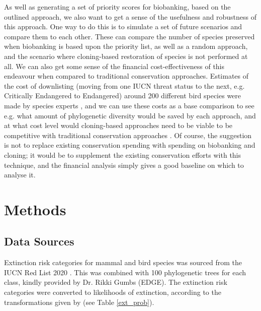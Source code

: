 \documentclass[10pt]{article}
\begin{document}
	As well as generating a set of priority scores for biobanking, based on the
	outlined approach, we also want to get a sense of the usefulness and
	robustness of this approach. One way to do this is to simulate a set of future
	scenarios and compare them to each other. These can compare the number of species
	preserved when biobanking is based upon the priority list, as well as a random
	approach, and the scenario where cloning-based restoration of species is not
	performed at all. We can also get some sense of the financial cost-effectiveness of
	this endeavour when compared to traditional conservation approaches. Estimates of the
	cost of downlisting (moving from one IUCN threat status to the next, e.g. Critically
	Endangered to Endangered) around 200 different bird species were made by
	species experts \cite{mccarthyFinancialCostsMeeting2012}, and we can use these costs as a base comparison to see e.g. what
	amount of phylogenetic diversity would be saved by each approach, and at what
	cost level would cloning-based approaches need to be viable to be competitive
	with traditional conservation approaches \cite{nunesPriceConservingAvian2015}. Of course, the suggestion is not to replace
	existing conservation spending with spending on biobanking and cloning; it would
	be to supplement the existing conservation efforts with this technique, and the
	financial analysis simply gives a good baseline on which to analyse it.

	
	
	
	\section{Methods}
	\subsection{Data Sources}
	Extinction risk categories for mammal and bird species was sourced from the IUCN Red List 2020 \cite{iucnIUCNRedList2021, IUCNRedList2012}. This was combined with 100 phylogenetic trees for each class, kindly provided by Dr. Rikki Gumbs (EDGE). %
	 The extinction risk categories were converted to likelihoods of extinction, according to the transformations given by \cite{mooersConvertingEndangeredSpecies2008} (see Table \ref{ext_prob}).
	
\end{document}
